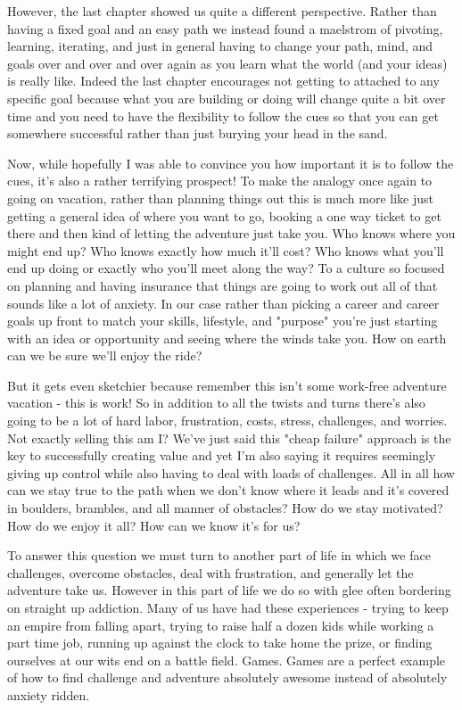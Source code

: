 \documentclass[11pt,a5paper]{book}
\begin{document}
However, the last chapter showed us quite a different perspective. Rather than having a fixed goal and an easy path we instead found a maelstrom of pivoting, learning, iterating, and just in general having to change your path, mind, and goals over and over and over again as you learn what the world (and your ideas) is really like. Indeed the last chapter encourages not getting to attached to any specific goal because what you are building or doing will change quite a bit over time and you need to have the flexibility to follow the cues so that you can get somewhere successful rather than just burying your head in the sand. 
\newline

Now, while hopefully I was able to convince you how important it is to follow the cues, it's also a rather terrifying prospect! To make the analogy once again to going on vacation, rather than planning things out this is much more like just getting a general idea of where you want to go, booking a one way ticket to get there and then kind of letting the adventure just take you. Who knows where you might end up? Who knows exactly how much it'll cost? Who knows what you'll end up doing or exactly who you'll meet along the way? To a culture so focused on planning and having insurance that things are going to work out all of that sounds like a lot of anxiety. In our case rather than picking a career and career goals up front to match your skills, lifestyle, and "purpose" you're just starting with an idea or opportunity and seeing where the winds take you. How on earth can we be sure we'll enjoy the ride?
\newline

But it gets even sketchier because remember this isn't some work-free adventure vacation - this is work! So in addition to all the twists and turns there's also going to be a lot of hard labor, frustration, costs, stress, challenges, and worries. Not exactly selling this am I? We've just said this "cheap failure" approach is the key to successfully creating value and yet I'm also saying it requires seemingly giving up control while also having to deal with loads of challenges. All in all how can we stay true to the path when we don't know where it leads and it's covered in boulders, brambles, and all manner of obstacles? How do we stay motivated? How do we enjoy it all? How can we know it's for us?
\newline

To answer this question we must turn to another part of life in which we face challenges, overcome obstacles, deal with frustration, and generally let the adventure take us. However in this part of life we do so with glee often bordering on straight up addiction. Many of us have had these experiences - trying to keep an empire from falling apart, trying to raise half a dozen kids while working a part time job, running up against the clock to take home the prize, or finding ourselves at our wits end on a battle field. Games. Games are a perfect example of how to find challenge and adventure absolutely awesome instead of absolutely anxiety ridden. 
\newline
\end{document}
